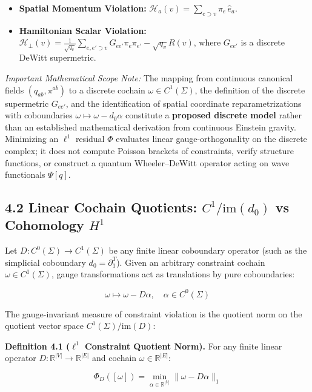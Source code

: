 \documentclass[11pt]{article}
\begin{document}
\begin{itemize}[leftmargin=1.4em,itemsep=0.2em]
\item \textbf{Spatial Momentum Violation:} $\mathcal{H}_a(v) = \sum_{e \supset v} \pi_e \, \hat{e}_a$.
\item \textbf{Hamiltonian Scalar Violation:} $\mathcal{H}_\perp(v) = \frac{1}{\sqrt{q_v}} \sum_{e, e' \supset v} G_{ee'} \pi_e \pi_{e'} - \sqrt{q_v} R(v)$, where $G_{ee'}$ is a discrete DeWitt supermetric.
\end{itemize}
\emph{Important Mathematical Scope Note:} The mapping from continuous canonical fields $(q_{ab}, \pi^{ab})$ to a discrete cochain $\omega \in C^1(\Sigma)$, the definition of the discrete supermetric $G_{ee'}$, and the identification of spatial coordinate reparametrizations with coboundaries $\omega \mapsto \omega - d_0 \alpha$ constitute a \textbf{proposed discrete model} rather than an established mathematical derivation from continuous Einstein gravity. Minimizing an $\ell^1$ residual $\Phi$ evaluates linear gauge-orthogonality on the discrete complex; it does not compute Poisson brackets of constraints, verify structure functions, or construct a quantum Wheeler--DeWitt operator acting on wave functionals $\Psi[q]$.

\subsection{\texorpdfstring{4.2 Linear Cochain Quotients: $C^1 / \mathrm{im}(d_0)$ vs Cohomology $H^1$}{4.2 Linear Cochain Quotients: C¹ / im(d₀) vs Cohomology H¹}}

Let $D: C^0(\Sigma) \to C^1(\Sigma)$ be any finite linear coboundary operator (such as the simplicial coboundary $d_0 = \partial_1^T$). Given an arbitrary constraint cochain $\omega \in C^1(\Sigma)$, gauge transformations act as translations by pure coboundaries:

\begin{equation*}
\omega \mapsto \omega - D \alpha, \quad \alpha \in C^0(\Sigma)
\end{equation*}

The gauge-invariant measure of constraint violation is the quotient norm on the quotient vector space $C^1(\Sigma) / \mathrm{im}(D)$:

\textbf{Definition 4.1 ($\ell^1$ Constraint Quotient Norm).} For any finite linear operator $D: \mathbb{R}^{|V|} \to \mathbb{R}^{|E|}$ and cochain $\omega \in \mathbb{R}^{|E|}$:

\begin{equation*}
\Phi_D([\omega]) = \min_{\alpha \in \mathbb{R}^{|V|}} \|\omega - D \alpha\|_1
\end{equation*}
\end{document}
